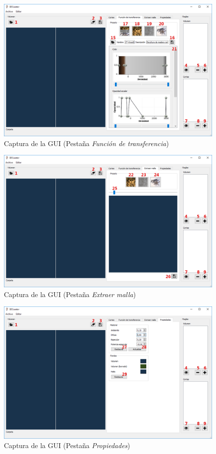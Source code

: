 \begin{figure}[H]
	\centering
	\includegraphics[width=12.5cm]{imagenes/gui_2}
	\caption{Captura de la GUI (Pestaña \textit{Función de transferencia})}
	\label{fig:gui_2}
\end{figure}

\begin{figure}[H]
	\centering
	\includegraphics[width=12.5cm]{imagenes/gui_3}
	\caption{Captura de la GUI (Pestaña \textit{Extraer malla})}
	\label{fig:gui_3}
\end{figure}

\begin{figure}[H]
	\centering
	\includegraphics[width=12.5cm]{imagenes/gui_4}
	\caption{Captura de la GUI (Pestaña \textit{Propiedades})}
	\label{fig:gui_4}
\end{figure}

